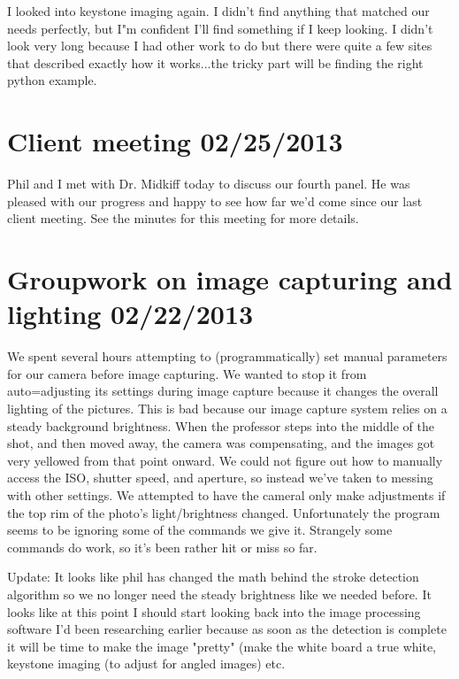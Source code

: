 \documentclass[]{article}
\begin{document}
	I looked into keystone imaging again. I didn't find anything that matched our needs perfectly, but I"m confident I'll find something if I keep looking. I didn't look very long because I had other work to do but there were quite a few sites that described exactly how it works...the tricky part will be finding the right python example.
	
	\section{Client meeting 02/25/2013}
	
	Phil and I met with Dr. Midkiff today to discuss our fourth panel. He was pleased with our progress and happy to see how far we'd come since our last client meeting. See the minutes for this meeting for more details.
	
	\section{Groupwork on image capturing and lighting 02/22/2013}
	
	We spent several hours attempting to (programmatically) set manual parameters for our camera before image capturing. We wanted to stop it from auto=adjusting its settings during image capture because it changes the overall lighting of the pictures. This is bad because our image capture system relies on a steady background brightness. When the professor steps into the middle of the shot, and then moved away, the camera was compensating, and the images got very yellowed from that point onward. We could not figure out how to manually access the ISO, shutter speed, and aperture, so instead we've taken to messing with other settings. We attempted to have the cameral only make adjustments if the top rim of the photo's light/brightness changed. Unfortunately the program seems to be ignoring some of the commands we give it. Strangely some commands do work, so it's been rather hit or miss so far.
	
	Update: It looks like phil has changed the math behind the stroke detection algorithm so we no longer need the steady brightness like we needed before. It looks like at this point I should start looking back into the image processing software I'd been researching earlier because as soon as the detection is complete it will be time to make the image "pretty" (make the white board a true white, keystone imaging (to adjust for angled images) etc.
	
\end{document}
